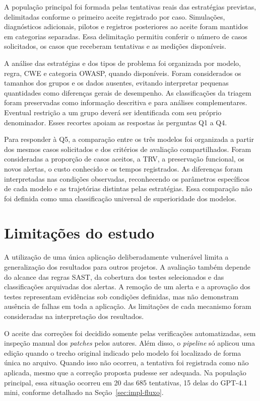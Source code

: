 A população principal foi formada pelas tentativas reais das estratégias previstas, delimitadas conforme o primeiro aceite registrado por caso. Simulações, diagnósticos adicionais, pilotos e registros posteriores ao aceite foram mantidos em categorias separadas. Essa delimitação permitiu conferir o número de casos solicitados, os casos que receberam tentativas e as medições disponíveis.

A análise das estratégias e dos tipos de problema foi organizada por modelo, regra, CWE e categoria OWASP, quando disponíveis. Foram considerados os tamanhos dos grupos e os dados ausentes, evitando interpretar pequenas quantidades como diferenças gerais de desempenho. As classificações da triagem foram preservadas como informação descritiva e para análises complementares. Eventual restrição a um grupo deverá ser identificada com seu próprio denominador. Esses recortes apoiam as respostas às perguntas Q1 a Q4.

Para responder à Q5, a comparação entre os três modelos foi organizada a partir dos mesmos casos solicitados e dos critérios de avaliação compartilhados. Foram consideradas a proporção de casos aceitos, a TRV, a preservação funcional, os novos alertas, o custo conhecido e os tempos registrados. As diferenças foram interpretadas nas condições observadas, reconhecendo os parâmetros específicos de cada modelo e as trajetórias distintas pelas estratégias. Essa comparação não foi definida como uma classificação universal de superioridade dos modelos.

\section{Limitações do estudo}
\label{sec:met-limitacoes}

A utilização de uma única aplicação deliberadamente vulnerável limita a generalização dos resultados para outros projetos. A avaliação também depende do alcance das regras SAST, da cobertura dos testes selecionados e das classificações arquivadas dos alertas. A remoção de um alerta e a aprovação dos testes representam evidências sob condições definidas, mas não demonstram ausência de falhas em toda a aplicação. As limitações de cada mecanismo foram consideradas na interpretação dos resultados.

O aceite das correções foi decidido somente pelas verificações automatizadas, sem inspeção manual dos \textit{patches} pelos autores. Além disso, o \textit{pipeline} só aplicou uma edição quando o trecho original indicado pelo modelo foi localizado de forma única no arquivo. Quando isso não ocorreu, a tentativa foi registrada como não aplicada, mesmo que a correção proposta pudesse ser adequada. Na população principal, essa situação ocorreu em 20 das 685 tentativas, 15 delas do GPT-4.1 mini, conforme detalhado na Seção~\ref{sec:impl-fluxo}.

